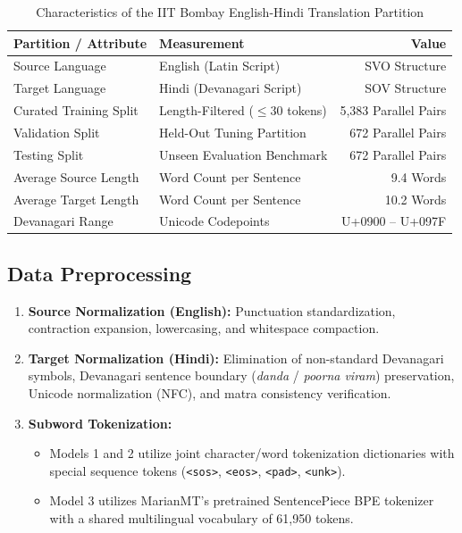 \documentclass[12pt,a4paper]{report}
\begin{document}
\begin{table}[H]
\centering
\caption{Characteristics of the IIT Bombay English-Hindi Translation Partition}
\label{tab:exp10_dataset}
\begin{tabular}{llr}
\toprule
\textbf{Partition / Attribute} & \textbf{Measurement} & \textbf{Value} \\
\midrule
Source Language & English (Latin Script) & SVO Structure \\
Target Language & Hindi (Devanagari Script) & SOV Structure \\
Curated Training Split & Length-Filtered ($\le 30$ tokens) & 5,383 Parallel Pairs \\
Validation Split & Held-Out Tuning Partition & 672 Parallel Pairs \\
Testing Split & Unseen Evaluation Benchmark & 672 Parallel Pairs \\
Average Source Length & Word Count per Sentence & 9.4 Words \\
Average Target Length & Word Count per Sentence & 10.2 Words \\
Devanagari Range & Unicode Codepoints & U+0900 -- U+097F \\
\bottomrule
\end{tabular}
\end{table}

\subsection{Data Preprocessing}
\begin{enumerate}
    \item \textbf{Source Normalization (English):} Punctuation standardization, contraction expansion, lowercasing, and whitespace compaction.
    \item \textbf{Target Normalization (Hindi):} Elimination of non-standard Devanagari symbols, Devanagari sentence boundary (\textit{danda} / \textit{poorna viram}) preservation, Unicode normalization (NFC), and matra consistency verification.
    \item \textbf{Subword Tokenization:}
    \begin{itemize}
        \item Models 1 and 2 utilize joint character/word tokenization dictionaries with special sequence tokens (\lstinline|<sos>|, \lstinline|<eos>|, \lstinline|<pad>|, \lstinline|<unk>|).
        \item Model 3 utilizes MarianMT's pretrained SentencePiece BPE tokenizer with a shared multilingual vocabulary of 61,950 tokens.
    \end{itemize}
\end{enumerate}
\end{document}

